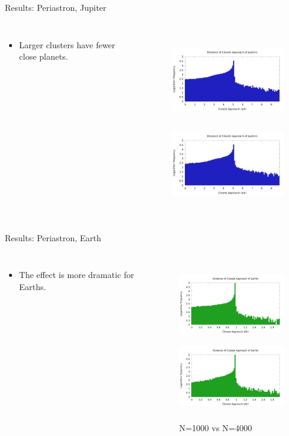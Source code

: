 \documentclass{beamer}
\begin{document}
\begin{frame}{Results: Periastron, Jupiter}
    \begin{columns}
        \begin{itemize}
            \item Larger clusters have fewer close planets.
        \end{itemize}
        \begin{figure}
            \includegraphics[height=1.40in]{periastron_jupiter_1000.png} \\
            \includegraphics[height=1.40in]{periastron_jupiter_4000.png}
        \end{figure}
    \end{columns}
\end{frame}

\begin{frame}{Results: Periastron, Earth}
    \begin{columns}
        \begin{itemize}
            \item The effect is more dramatic for Earths.
        \end{itemize}
        \begin{figure}
            \centering
            \caption{N=1000 vs N=4000}
            \includegraphics[height=1.20in]{periastron_earth_1000.png} \\
            \includegraphics[height=1.20in]{periastron_earth_4000.png}
        \end{figure}
    \end{columns}
\end{frame}
\end{document}
